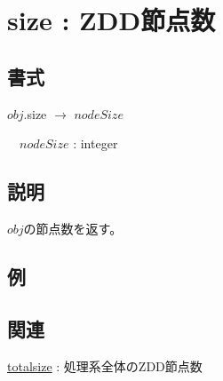 
\section{size : ZDD節点数\label{sect:size}}
\subsection*{書式}
$obj$.size $\rightarrow$ $nodeSize$

~~$nodeSize$ : integer

\subsection*{説明}
$obj$の節点数を返す。

\subsection*{例}


\subsection*{関連}
\hyperref[sect:totalsize]{totalsize} : 処理系全体のZDD節点数


